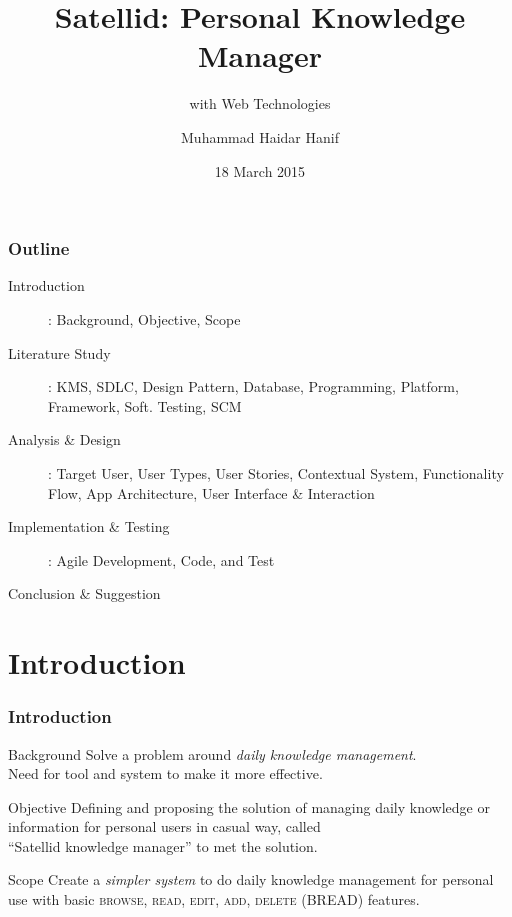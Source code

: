 \documentclass[10pt, compress]{beamer}
\title{Satellid: Personal Knowledge Manager}
\subtitle{with Web Technologies}
\date{18 March 2015}
\author{Muhammad Haidar Hanif}
\institute{Gunadarma University}
\begin{document}

\maketitle



\begin{frame}[fragile]
  \frametitle{Outline}

  \begin{description}
    \item[Introduction]: Background, Objective, Scope
    \item[Literature Study]: KMS, SDLC, Design Pattern, Database, Programming, Platform, Framework, Soft. Testing, SCM
    \item[Analysis \& Design]: Target User, User Types, User Stories, Contextual System, Functionality Flow, App Architecture, User Interface \& Interaction
    \item[Implementation \& Testing]: Agile Development, Code, and Test
    \item[Conclusion \& Suggestion]
  \end{description}

\end{frame}


\section{Introduction}


\begin{frame}[fragile]
  \frametitle{Introduction}

  \begin{block}{Background}
    Solve a problem around \alert{\emph{daily knowledge management}}.\\
    Need for tool and system to make it more effective.
  \end{block}

  \begin{block}{Objective}
    Defining and proposing the solution of managing daily knowledge or information for personal users in casual way, called\\ \alert{``Satellid knowledge manager''} to met the solution.
  \end{block}

  \begin{block}{Scope}
    \alert{Create a \emph{simpler system}} to do daily knowledge management for personal use with basic \textsc{browse, read, edit, add, delete} (BREAD) features.
  \end{block}

\end{frame}
\end{document}
